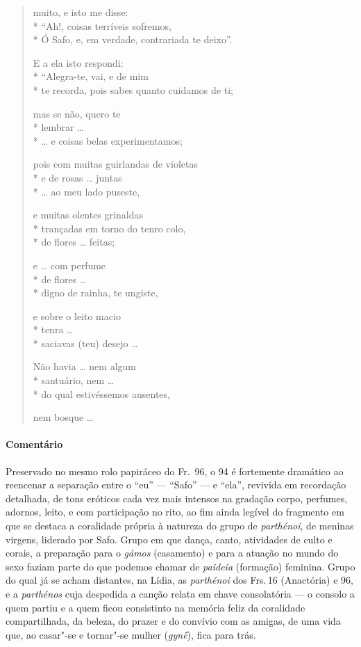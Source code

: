 {\begin{verse}
muito, e isto me disse:\\*
“Ah!, coisas terríveis sofremos,\\*
Ó Safo, e, em verdade, contrariada te deixo”.

E a ela isto respondi:\\*
“Alegra-te, vai, e de mim\\*
te recorda, pois sabes quanto cuidamos de ti;

mas se não, quero te\\*
lembrar \ldots{}\\*
\ldots{} e coisas belas experimentamos;

pois com muitas guirlandas de violetas\\*
e de rosas \ldots{} juntas\\*
\ldots{} ao meu lado puseste,			

e muitas olentes grinaldas\\*
trançadas em torno do tenro colo, \\*
de flores \ldots{} feitas;

e \ldots{} com perfume\\*
de flores \ldots{}\\*
digno de rainha, te ungiste,

e sobre o leito macio\\*
tenra \ldots{}\\*
saciavas (teu) desejo \ldots{}

Não havia \ldots{} nem algum\\*
santuário, nem \ldots{}\\*
do qual estivéssemos ausentes,

nem bosque \ldots{}
\end{verse}

{\paragraph{Comentário} Preservado no mesmo rolo papiráceo do Fr.~96, o 94 é fortemente dramático ao
reencenar a separação entre o “eu” --- ``Safo” --- e “ela”, revivida em
recordação detalhada, de tons eróticos cada vez mais intensos na
gradação corpo, perfumes, adornos, leito, e com participação no rito,
ao fim ainda legível do fragmento em que se destaca a coralidade própria à natureza do grupo de \textit{parthénoi}, de meninas virgens, liderado por Safo. Grupo em que dança, canto, atividades de culto e corais, a preparação para o \textit{gámos} (casamento) e para a atuação no mundo do sexo faziam parte do que podemos chamar de \textit{paideía} (formação) feminina. Grupo do qual já se acham distantes, na Lídia, as \textit{parthénoi} dos Frs.\,16 (Anactória) e 96, e a \textit{parthénos} cuja despedida a canção relata em chave consolatória --- o consolo a quem partiu e a quem ficou consistinto na memória feliz da coralidade compartilhada, da beleza, do prazer e do convívio com as amigas, de uma vida que, ao casar"-se e tornar"-se mulher (\textit{gynḗ}), fica para trás.

}}
